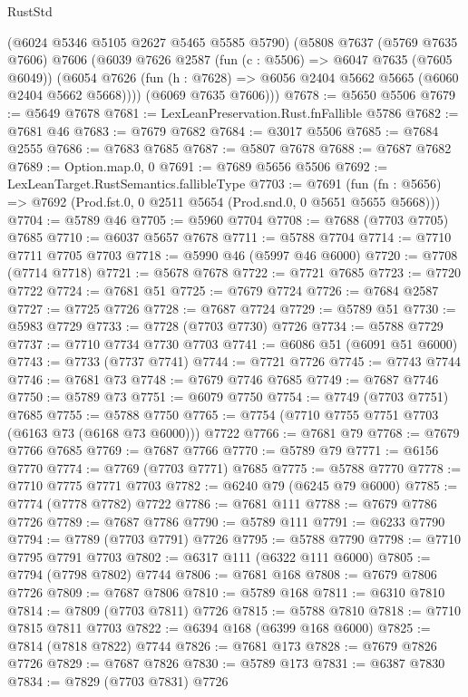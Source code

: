 \begin{lexlean}{RustStd}
\begin{coremodule}
      (@6024 @5346 @5105 @2627 @5465 @5585 @5790)
      (@5808
        @7637
        (@5769 @7635 @7606)
        @7606
        (@6039
          @7626
          @2587
          (fun (c : @5506) => @6047 @7635 (@7605 @6049))
          (@6054 @7626 (fun (h : @7628) => @6056 @2404 @5662 @5665 (@6060 @2404 @5662 @5668))))
        (@6069 @7635 @7606)))
@7678 := @5650 @5506
@7679 := @5649 @7678
@7681 := LexLeanPreservation.Rust.fnFallible @5786
@7682 := @7681 @46
@7683 := @7679 @7682
@7684 := @3017 @5506
@7685 := @7684 @2555
@7686 := @7683 @7685
@7687 := @5807 @7678
@7688 := @7687 @7682
@7689 := Option.map.{0, 0}
@7691 := @7689 @5656 @5506
@7692 := LexLeanTarget.RustSemantics.fallibleType
@7703 := @7691
    (fun (fn : @5656) => @7692 (Prod.fst.{0, 0} @2511 @5654 (Prod.snd.{0, 0} @5651 @5655 @5668)))
@7704 := @5789 @46
@7705 := @5960 @7704
@7708 := @7688 (@7703 @7705) @7685
@7710 := @6037 @5657 @7678
@7711 := @5788 @7704
@7714 := @7710 @7711 @7705 @7703
@7718 := @5990 @46 (@5997 @46 @6000)
@7720 := @7708 (@7714 @7718)
@7721 := @5678 @7678
@7722 := @7721 @7685
@7723 := @7720 @7722
@7724 := @7681 @51
@7725 := @7679 @7724
@7726 := @7684 @2587
@7727 := @7725 @7726
@7728 := @7687 @7724
@7729 := @5789 @51
@7730 := @5983 @7729
@7733 := @7728 (@7703 @7730) @7726
@7734 := @5788 @7729
@7737 := @7710 @7734 @7730 @7703
@7741 := @6086 @51 (@6091 @51 @6000)
@7743 := @7733 (@7737 @7741)
@7744 := @7721 @7726
@7745 := @7743 @7744
@7746 := @7681 @73
@7748 := @7679 @7746 @7685
@7749 := @7687 @7746
@7750 := @5789 @73
@7751 := @6079 @7750
@7754 := @7749 (@7703 @7751) @7685
@7755 := @5788 @7750
@7765 := @7754 (@7710 @7755 @7751 @7703 (@6163 @73 (@6168 @73 @6000))) @7722
@7766 := @7681 @79
@7768 := @7679 @7766 @7685
@7769 := @7687 @7766
@7770 := @5789 @79
@7771 := @6156 @7770
@7774 := @7769 (@7703 @7771) @7685
@7775 := @5788 @7770
@7778 := @7710 @7775 @7771 @7703
@7782 := @6240 @79 (@6245 @79 @6000)
@7785 := @7774 (@7778 @7782) @7722
@7786 := @7681 @111
@7788 := @7679 @7786 @7726
@7789 := @7687 @7786
@7790 := @5789 @111
@7791 := @6233 @7790
@7794 := @7789 (@7703 @7791) @7726
@7795 := @5788 @7790
@7798 := @7710 @7795 @7791 @7703
@7802 := @6317 @111 (@6322 @111 @6000)
@7805 := @7794 (@7798 @7802) @7744
@7806 := @7681 @168
@7808 := @7679 @7806 @7726
@7809 := @7687 @7806
@7810 := @5789 @168
@7811 := @6310 @7810
@7814 := @7809 (@7703 @7811) @7726
@7815 := @5788 @7810
@7818 := @7710 @7815 @7811 @7703
@7822 := @6394 @168 (@6399 @168 @6000)
@7825 := @7814 (@7818 @7822) @7744
@7826 := @7681 @173
@7828 := @7679 @7826 @7726
@7829 := @7687 @7826
@7830 := @5789 @173
@7831 := @6387 @7830
@7834 := @7829 (@7703 @7831) @7726

\end{coremodule}
\end{lexlean}
